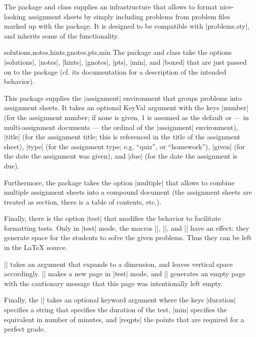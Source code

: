 
The  package and class supplies an infrastructure that allows to format
nice-looking assignment sheets by simply including problems from problem files marked up
with the  package.  It is designed to be compatible with |problems.sty|, and
inherits some of the functionality.

\begin{variable}{solutions,notes,hints,gnotes,pts,min}
  The  package and class take the options |solutions|, |notes|, |hints|,
  |gnotes|, |pts|, |min|, and |boxed| that are just passed on to the 
  package (cf. its documentation for a description of the intended behavior).
\end{variable}

This package supplies the |assignment| environment that groups
problems into assignment sheets. It takes an optional KeyVal argument with the keys
|number| (for the assignment number; if none is given, 1 is
assumed as the default or --- in multi-assignment documents --- the ordinal of the
|assignment| environment), |title| (for the assignment title; this
is referenced in the title of the assignment sheet), |type| (for the
assignment type; e.g. ``quiz'', or ``homework''), |given| (for the
date the assignment was given), and |due| (for the date the
assignment is due).

Furthermore, the  package takes the option
|multiple| that allows to combine multiple assignment sheets
into a compound document (the assignment sheets are treated as section, there is a table
of contents, etc.).

Finally, there is the option |test| that modifies the behavior to
facilitate formatting tests. Only in |test| mode, the macros |\testspace|,
|\testnewpage|, and |\testemptypage| have an effect: they generate space for the
students to solve the given problems. Thus they can be left in the {\LaTeX} source. 

\DescribeMacro{\testspace}|\testspace| takes an argument that expands to a dimension,
and leaves vertical space accordingly. \DescribeMacro{\testnewpage}|\testnewpage| makes
a new page in |test| mode, and \DescribeMacro{\testemptypage}|\testemptypage| generates
an empty page with the cautionary message that this page was intentionally left empty.

Finally, the |\testheading| takes an optional keyword argument
where the keys |duration| specifies a string that specifies the
duration of the test, |min| specifies the equivalent in number of
minutes, and |reqpts| the points that are required for a perfect
grade.

